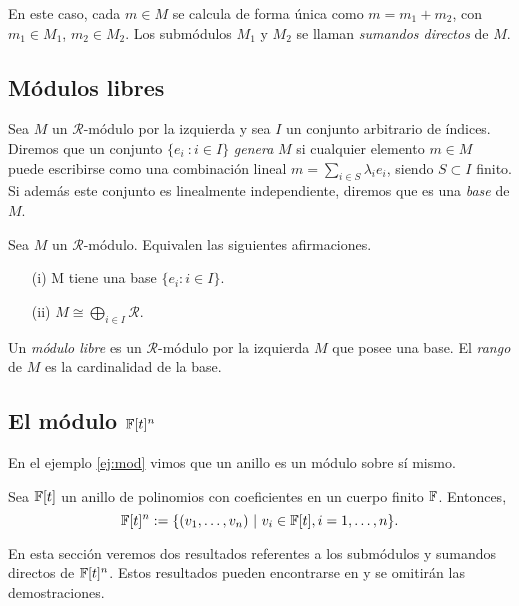 En este caso, cada $m \in M$ se calcula de forma única como $m = m_1 + m_2$, con $m_1 \in M_1$, $m_2 \in M_2$. Los submódulos $M_1$ y $M_2$ se llaman \emph{sumandos directos} de $M$.

\subsection{Módulos libres}

\begin{definicion}
Sea $M$ un $\mathcal{R}$-módulo por la izquierda y sea $I$ un conjunto arbitrario de índices. Diremos que un conjunto $\{e_i\ : i \in I\}$ \emph{genera} $M$ si cualquier elemento $m \in M$ puede escribirse como una combinación lineal $m = \sum_{i \in S} \lambda_ie_i$, siendo $S \subset I$ finito. Si además este conjunto es linealmente independiente, diremos que es una \emph{base} de $M$.
\end{definicion} 

\begin{teorema}
    Sea $M$ un $\mathcal{R}$-módulo. Equivalen las siguientes afirmaciones.

    \begin{itemize}
        \item[(i)] M tiene una base $\{e_i : i \in I\}$.
        \item[(ii)] $M \cong \bigoplus_{i \in I} \mathcal{R}$.
    \end{itemize}
\end{teorema}

\begin{definicion}
Un \emph{módulo libre} es un $\mathcal{R}$-módulo por la izquierda $M$ que posee una base. El \emph{rango} de $M$ es la cardinalidad de la base.
\end{definicion}

\subsection{El módulo $\mathbb{F}[t]^n$}

En el ejemplo \ref{ej:mod} vimos que un anillo es un módulo sobre sí mismo. 

Sea $\mathbb{F}[t]$ un anillo de polinomios con coeficientes en un cuerpo finito $\mathbb{F}$. Entonces, $$\mathbb{F}[t]^n := \{(v_1,\dots,v_n) \ | \ v_i \in \mathbb{F}[t], i=1,\dots,n\}.$$

En esta sección veremos dos resultados referentes a los submódulos y sumandos directos de $\mathbb{F}[t]^n$. Estos resultados pueden encontrarse en \cite{cccheide} y se omitirán las demostraciones.

